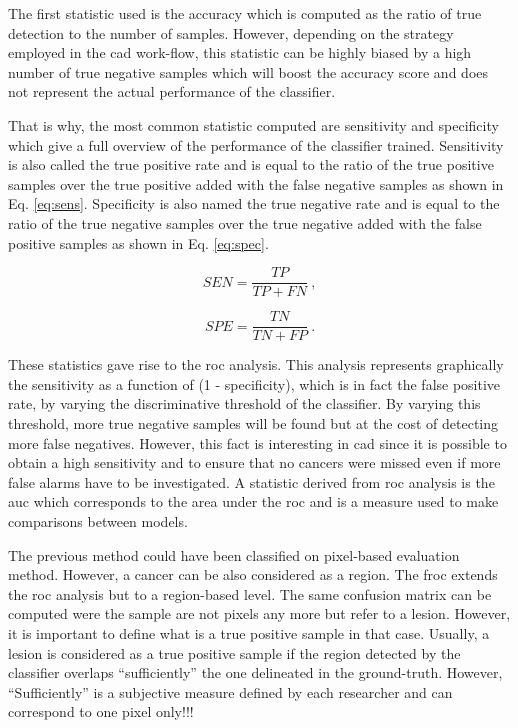The first statistic used is the accuracy which is computed as the ratio of true detection to the number of samples. However, depending on the strategy employed in the \ac{cad} work-flow, this statistic can be highly biased by a high number of true negative samples which will boost the accuracy score and does not represent the actual performance of the classifier.

That is why, the most common statistic computed are sensitivity and specificity which give a full overview of the performance of the classifier trained. Sensitivity is also called the true positive rate and is equal to the ratio of the true positive samples over the true positive added with the false negative samples as shown in Eq. \eqref{eq:sens}. Specificity is also named the true negative rate and is equal to the ratio of the true negative samples over the true negative added with the false positive samples as shown in Eq. \eqref{eq:spec}.

\begin{equation}
	SEN = \frac{TP}{TP+FN} \ ,
	\label{eq:sens}
\end{equation}

\begin{equation}
	SPE = \frac{TN}{TN+FP} \ .
	\label{eq:spec}
\end{equation}

These statistics gave rise to the \acf{roc} analysis. This analysis represents graphically the sensitivity as a function of (1 - specificity), which is in fact the false positive rate, by varying the discriminative threshold of the classifier. By varying this threshold, more true negative samples will be found but at the cost of detecting more false negatives. However, this fact is interesting in \ac{cad} since it is possible to obtain a high sensitivity and to ensure that no cancers were missed even if more false alarms have to be investigated. A statistic derived from \ac{roc} analysis is the \acf{auc} which corresponds to the area under the \ac{roc} and is a measure used to make comparisons between models.

The previous method could have been classified on pixel-based evaluation method. However, a cancer can be also considered as a region. The \acf{froc} extends the \ac{roc} analysis but to a region-based level. The same confusion matrix can be computed were the sample are not pixels any more but refer to a lesion. However, it is important to define what is a true positive sample in that case. Usually, a lesion is considered as a true positive sample if the region detected by the classifier overlaps ``sufficiently'' the one delineated in the ground-truth. However, ``Sufficiently'' is a subjective measure defined by each researcher and can correspond to one pixel only!!!

